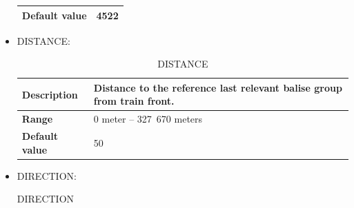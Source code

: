 \documentclass{template/openetcs}
\begin{document}
\begin{itemize}
\begin{longtable}{|l|l|}
				\hline
				
					\begin{minipage}[t]{0.22\linewidth} \textbf{Default value} \end{minipage} 
				&	\begin{minipage}[t]{0.78\linewidth} 4522 \end{minipage} \\
				
				\hline
				
			\end{longtable}
			
		\item DISTANCE:
													
			\begin{longtable}{|l|l|}
				\caption{DISTANCE}\\ 
				\hline
				
					\begin{minipage}[t]{0.22\linewidth} \textbf{Description} \end{minipage} 
				&	\begin{minipage}[t]{0.78\linewidth} Distance to the reference last relevant balise group from train front. \end{minipage} \\
				
				\hline
																																									
					\begin{minipage}[t]{0.22\linewidth} \textbf{Range}	\end{minipage} 
				&	\begin{minipage}[t]{0.78\linewidth} 0 meter – 327 670 meters \end{minipage} \\
				
				\hline
				
					\begin{minipage}[t]{0.22\linewidth} \textbf{Default value}	\end{minipage} 
				&	\begin{minipage}[t]{0.78\linewidth} 50 \end{minipage} \\
				
				\hline
				
			\end{longtable}
		
		\item DIRECTION:
															
			\begin{longtable}{|l|l|}
				\caption{DIRECTION}\\ 
				\hline
				

\end{longtable}
\end{itemize}
\end{document}

